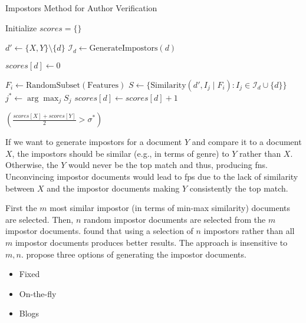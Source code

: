 \begin{algorithm}
    \caption{Impostors Method for Author Verification}
    \label{alg:impostor_algo}
    \begin{algorithmic}[1]
    
        \State Initialize $scores = \{\}$ 
    
            \State $d' \gets \{X, Y\} \setminus \{d\}$ 
            \State $\mathcal{I}_d \gets \text{GenerateImpostors}(d)$ 
    
            \State $scores[d] \gets 0$ 
    
                \State $F_i \gets \text{RandomSubset}(\text{Features})$ 
                \State $S \gets \{ \text{Similarity}(d', I_j \mid F_i) : I_j \in \mathcal{I}_d \cup \{d\} \}$ 
                \State $j^* \gets \arg\max_j S_j$ 
                 
                    \State $scores[d] \gets scores[d] + 1$ 

                \EndIf
            \EndFor
        \EndFor
    
        \State \Return $\left( \frac{scores[X] + scores[Y]}{2} > \sigma^* \right)$ 
    \EndProcedure
    \end{algorithmic}
    \end{algorithm}
    
If we want to generate impostors for a document $Y$ and compare it to a document $X$, 
the impostors should be similar (e.g., in terms of genre) to $Y$ rather than $X$.
Otherwise, the $Y$ would never be the top match and thus, producing \acp{fn}.
Unconvincing impostor documents would lead to \acp{fp} due to the lack of similarity between $X$ and the impostor documents making $Y$ consistently the top match.

First the $m$ most similar impostor (in terms of min-max similarity) documents are selected.
Then, $n$ random impostor documents are selected from the $m$ impostor documents.
\citet{koppel_determining_2014} found that using a selection of $n$ impostors rather than all $m$ impostor documents produces better results.
The approach is insensitive to $m,n$.
\citet{koppel_determining_2014} propose three options of generating the impostor documents.
\begin{itemize}
    \item Fixed
    \item On-the-fly
    \item Blogs
\end{itemize}

